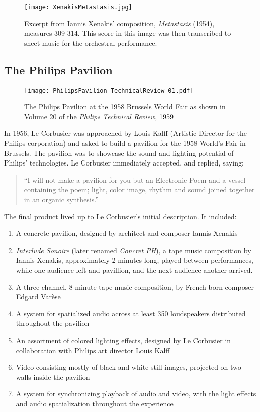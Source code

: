 \begin{figure*}[h]
  \texttt{[image: XenakisMetastasis.jpg]}
  \caption{Excerpt from Iannis Xenakis' composition,
    \textit{Metastasis} (1954), measures 309-314. This score in this
    image was then transcribed to sheet music for the orchestral
    performance.}
  \label{fig:metastasis}
\end{figure*}

\subsection{The Philips Pavilion}
\label{sec:philips-pavilion-1}
\begin{figure}[h]
  \texttt{[image: PhilipsPavilion-TechnicalReview-01.pdf]}
  \caption{The Philips Pavilion at the 1958 Brussels World Fair as
    shown in Volume 20 of the \textit{Philips Technical Review}, 1959}
  \label{fig:philips-pavilion-photo}
\end{figure}
In 1956, Le Corbusier was approached by Louis Kalff (Artistic Director
for the Philips corporation) and asked to build a pavilion for the
1958 World's Fair in Brussels. The pavilion was to showcase the sound
and lighting potential of Philips' technologies. Le Corbusier
immediately accepted, and replied, saying:
\begin{quotation}
  ``I will not make a pavilion for you but an Electronic Poem and a
  vessel containing the poem; light, color image, rhythm and sound
  joined together in an organic synthesis.''\cite{Lopez2011} 
\end{quotation}
The final product lived up to Le Corbusier's initial description. It
included:\cite{Lombardo2009}
\begin{enumerate}
\item A concrete pavilion, designed by architect and composer Iannis
  Xenakis
\item \textit{Interlude Sonoire} (later renamed \textit{Concret PH}), a
  tape music composition by Iannis Xenakis, approximately 2 minutes
  long, played between performances, while one audience left and
  pavillion, and the next audience another arrived.
\item A three channel, 8 minute tape music composition, by French-born
  composer Edgard Var\`{e}se
\item A system for spatialized audio across at least 350 loudspeakers
  distributed throughout the pavilion
\item An assortment of colored lighting effects, designed by Le Corbusier in
  collaboration with Philips art director Louis Kalff
\item Video consisting mostly of black and white still images,
  projected on two walls inside the pavilion
\item A system for synchronizing playback of audio and video,
  with the light effects and audio spatialization throughout the
  experience
\end{enumerate} 

